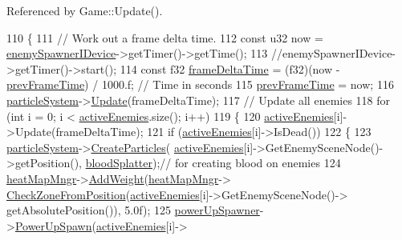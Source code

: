 Referenced by Game\-::\-Update().


\begin{DoxyCode}
110 \{
111     \textcolor{comment}{// Work out a frame delta time.}
112     \textcolor{keyword}{const} u32 now = \hyperlink{_enemy_spawner_8cpp_a6fb6c47d7964fa1186985510e544e686}{enemySpawnerIDevice}->getTimer()->getTime();
113     \textcolor{comment}{//enemySpawnerIDevice->getTimer()->start();}
114     \textcolor{keyword}{const} f32 \hyperlink{_player_8cpp_adc988571147642cda93afbf89783f9c9}{frameDeltaTime} = (f32)(now - \hyperlink{_enemy_spawner_8cpp_a7f39b7d91ba9b2a31bad8f8558b8a0d9}{prevFrameTime}) / 1000.f; \textcolor{comment}{// Time in
       seconds}
115     \hyperlink{_enemy_spawner_8cpp_a7f39b7d91ba9b2a31bad8f8558b8a0d9}{prevFrameTime} = now;
116     \hyperlink{_enemy_spawner_8cpp_a351bdd6d08cc3965554b639f8e11e360}{particleSystem}->\hyperlink{class_particle_system_ac60759503968e32b9cc25222995dd7d9}{Update}(frameDeltaTime);
117     \textcolor{comment}{// Update all enemies}
118     \textcolor{keywordflow}{for} (\textcolor{keywordtype}{int} i = 0; i < \hyperlink{_enemy_spawner_8cpp_a3d9bb20c5ed03047464ed534dc3938ba}{activeEnemies}.size(); i++)
119     \{
120         \hyperlink{_enemy_spawner_8cpp_a3d9bb20c5ed03047464ed534dc3938ba}{activeEnemies}[i]->Update(frameDeltaTime);
121         \textcolor{keywordflow}{if} (\hyperlink{_enemy_spawner_8cpp_a3d9bb20c5ed03047464ed534dc3938ba}{activeEnemies}[i]->IsDead())
122         \{
123             \hyperlink{_enemy_spawner_8cpp_a351bdd6d08cc3965554b639f8e11e360}{particleSystem}->\hyperlink{class_particle_system_a3f614e2d232b8ecbc7431c1302165bbf}{CreateParticles}(
      \hyperlink{_enemy_spawner_8cpp_a3d9bb20c5ed03047464ed534dc3938ba}{activeEnemies}[i]->GetEnemySceneNode()->getPosition(), \hyperlink{_enemy_spawner_8cpp_a84bd053a4e24606fcf8e340d82c0003c}{bloodSplatter});\textcolor{comment}{// for
       creating blood on enemies}
124             \hyperlink{_enemy_spawner_8cpp_a4dcc017b886f43aae8dec561367a6d3c}{heatMapMngr}->\hyperlink{class_heat_map_manager_aaf3b56067a76a49a9685b221d63c87b9}{AddWeight}(\hyperlink{_enemy_spawner_8cpp_a4dcc017b886f43aae8dec561367a6d3c}{heatMapMngr}->
      \hyperlink{class_heat_map_manager_a13bd9841f2166a91e2f3cf93671b82f9}{CheckZoneFromPosition}(\hyperlink{_enemy_spawner_8cpp_a3d9bb20c5ed03047464ed534dc3938ba}{activeEnemies}[i]->GetEnemySceneNode()->
      getAbsolutePosition()), 5.0f);
125             \hyperlink{_enemy_spawner_8cpp_aec329aff681c2ea4e3c05be077a87c7e}{powerUpSpawner}->\hyperlink{class_power_up_spawner_a7d10daa2eedceafdf8ceb352f6436db2}{PowerUpSpawn}(\hyperlink{_enemy_spawner_8cpp_a3d9bb20c5ed03047464ed534dc3938ba}{activeEnemies}[i]->

\end{DoxyCode}
